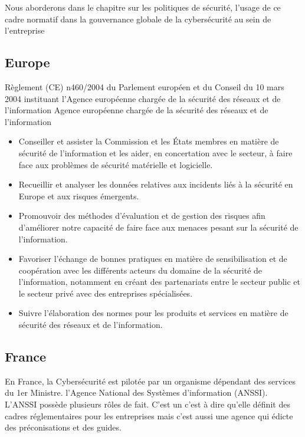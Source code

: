 Nous aborderons dans le chapitre sur les politiques de sécurité, l'usage de ce cadre normatif dans la gouvernance globale de la cybersécurité au sein de l'entreprise


\subsection{Europe}

Règlement (CE) n460/2004 du Parlement européen et du Conseil
du 10 mars 2004
instituant l'Agence européenne chargée de la sécurité des réseaux et de l'information
Agence européenne chargée de la sécurité des réseaux et de l'information

\begin{itemize}
  \item Conseiller et assister la Commission et les États membres en matière de sécurité de l'information et les aider, en concertation avec le secteur, à faire face aux problèmes de sécurité matérielle et logicielle.
  \item Recueillir et analyser les données relatives aux incidents liés à la sécurité en Europe et aux risques émergents.
  \item Promouvoir des méthodes d'évaluation et de gestion des risques afin d'améliorer notre capacité de faire face aux menaces pesant sur la sécurité de l'information.
  \item Favoriser l'échange de bonnes pratiques en matière de sensibilisation et de coopération avec les différents acteurs du domaine de la sécurité de l'information, notamment en créant des partenariats entre le secteur public et le secteur privé avec des entreprises spécialisées.
  \item Suivre l'élaboration des normes pour les produits et services en matière de sécurité des réseaux et de l'information.
\end{itemize}



\subsection{France}

En France, la Cybersécurité est pilotée par un organisme dépendant des services du 1er Ministre. l'Agence National des Systèmes d'information (ANSSI).
L'ANSSI possède plusieurs rôles de fait. C'est un  c'est à dire qu'elle définit des cadres réglementaires pour les entreprises mais c'est aussi une agence qui édicte des préconisations et des guides.

